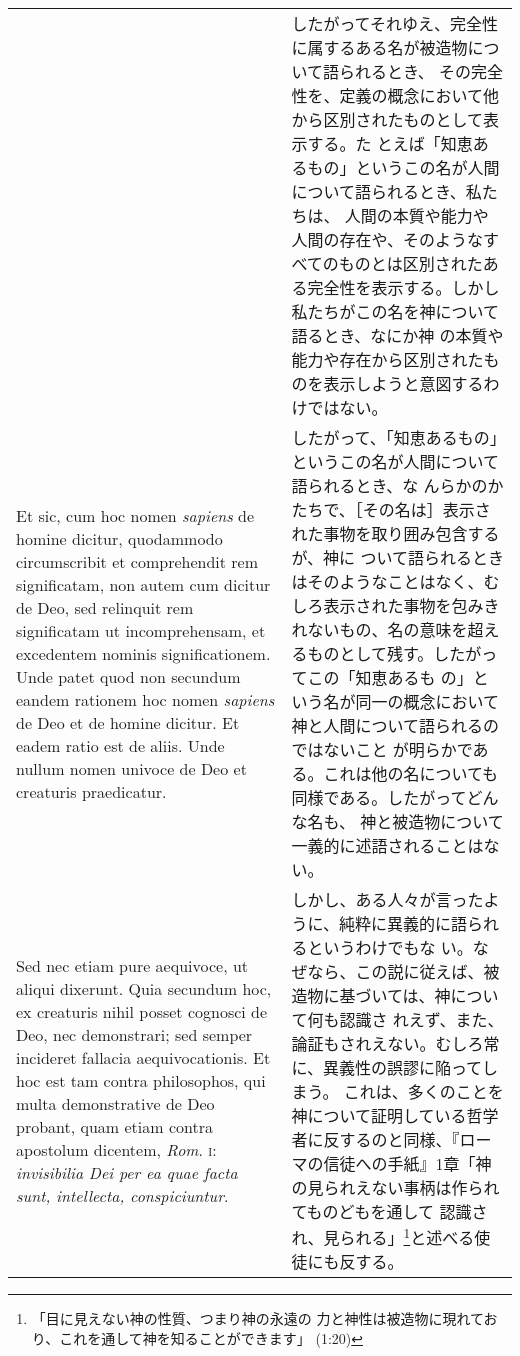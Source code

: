 \documentclass[paper=a4paper,fontsize=10pt,jafontsize=9pt,titlepage]{jlreq}
\begin{document}
\begin{longtable}{p{21em}p{21em}}
&

したがってそれゆえ、完全性に属するある名が被造物について語られるとき、
その完全性を、定義の概念において他から区別されたものとして表示する。た
とえば「知恵あるもの」というこの名が人間について語られるとき、私たちは、
人間の本質や能力や人間の存在や、そのようなすべてのものとは区別されたあ
る完全性を表示する。しかし私たちがこの名を神について語るとき、なにか神
の本質や能力や存在から区別されたものを表示しようと意図するわけではない。

\\

Et sic, cum hoc nomen {\itshape sapiens} de homine dicitur, quodammodo
circumscribit et comprehendit rem significatam, non autem cum dicitur
de Deo, sed relinquit rem significatam ut incomprehensam, et
excedentem nominis significationem. Unde patet quod non secundum
eandem rationem hoc nomen {\itshape sapiens} de Deo et de homine
dicitur. Et eadem ratio est de aliis. Unde nullum nomen univoce de Deo
et creaturis praedicatur.

&

したがって、「知恵あるもの」というこの名が人間について語られるとき、な
んらかのかたちで、［その名は］表示された事物を取り囲み包含するが、神に
ついて語られるときはそのようなことはなく、むしろ表示された事物を包みき
れないもの、名の意味を超えるものとして残す。したがってこの「知恵あるも
の」という名が同一の概念において神と人間について語られるのではないこと
が明らかである。これは他の名についても同様である。したがってどんな名も、
神と被造物について一義的に述語されることはない。

\\

Sed nec etiam pure aequivoce, ut aliqui dixerunt. Quia secundum hoc,
ex creaturis nihil posset cognosci de Deo, nec demonstrari; sed semper
incideret fallacia aequivocationis. Et hoc est tam contra philosophos,
qui multa demonstrative de Deo probant, quam etiam contra apostolum
dicentem, {\itshape Rom}. {\scshape i}: {\itshape invisibilia Dei per ea quae facta
sunt, intellecta, conspiciuntur}.

&

しかし、ある人々が言ったように、純粋に異義的に語られるというわけでもな
い。なぜなら、この説に従えば、被造物に基づいては、神について何も認識さ
れえず、また、論証もされえない。むしろ常に、異義性の誤謬に陥ってしまう。
これは、多くのことを神について証明している哲学者に反するのと同様、『ロー
マの信徒への手紙』1章「神の見られえない事柄は作られてものどもを通して
認識され、見られる」\footnote{「目に見えない神の性質、つまり神の永遠の
力と神性は被造物に現れており、これを通して神を知ることができます」
(1:20) }と述べる使徒にも反する。


\end{longtable}
\end{document}
